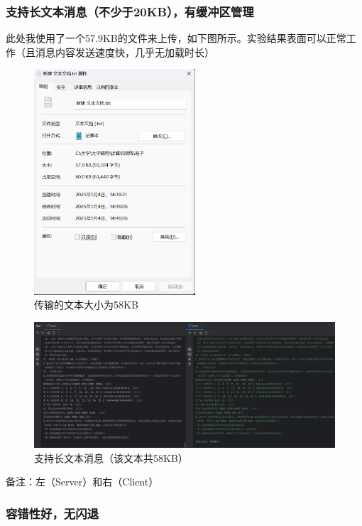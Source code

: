 \documentclass{article}
\begin{document}
	\subsubsection{支持长文本消息（不少于20KB），有缓冲区管理}
	
	此处我使用了一个57.9KB的文件来上传，如下图所示。实验结果表面可以正常工作（且消息内容发送速度快，几乎无加载时长）
	
	\begin{figure}[H]
		\centering
		\includegraphics[width=6cm]{./images/8.该文本58KB.png}
		\caption{传输的文本大小为58KB}
	\end{figure}
	
	\begin{figure}[H]
		\centering
		\includegraphics[width=15cm]{./images/8.支持长文本消息（该文本共58KB）.png}
		\caption{支持长文本消息（该文本共58KB）}
	\end{figure}
	
	备注：左（Server）和右（Client）
	
	\subsubsection{容错性好，无闪退}
	
\end{document}
